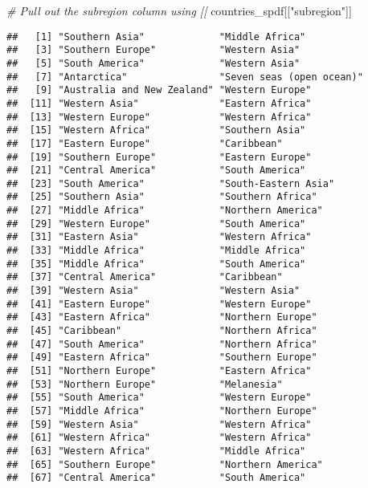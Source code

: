 \documentclass[]{article}
\newenvironment{Shaded}{\begin{snugshade}}{\end{snugshade}}
\newcommand{\CommentTok}[1]{\textcolor[rgb]{0.56,0.35,0.01}{\textit{#1}}}
\newcommand{\NormalTok}[1]{#1}
\newcommand{\StringTok}[1]{\textcolor[rgb]{0.31,0.60,0.02}{#1}}
\begin{document}
\begin{Shaded}
\begin{Highlighting}[]
\CommentTok{# Pull out the subregion column using [[}
\NormalTok{countries_spdf[[}\StringTok{"subregion"}\NormalTok{]]}
\end{Highlighting}
\end{Shaded}

\begin{verbatim}
##   [1] "Southern Asia"             "Middle Africa"            
##   [3] "Southern Europe"           "Western Asia"             
##   [5] "South America"             "Western Asia"             
##   [7] "Antarctica"                "Seven seas (open ocean)"  
##   [9] "Australia and New Zealand" "Western Europe"           
##  [11] "Western Asia"              "Eastern Africa"           
##  [13] "Western Europe"            "Western Africa"           
##  [15] "Western Africa"            "Southern Asia"            
##  [17] "Eastern Europe"            "Caribbean"                
##  [19] "Southern Europe"           "Eastern Europe"           
##  [21] "Central America"           "South America"            
##  [23] "South America"             "South-Eastern Asia"       
##  [25] "Southern Asia"             "Southern Africa"          
##  [27] "Middle Africa"             "Northern America"         
##  [29] "Western Europe"            "South America"            
##  [31] "Eastern Asia"              "Western Africa"           
##  [33] "Middle Africa"             "Middle Africa"            
##  [35] "Middle Africa"             "South America"            
##  [37] "Central America"           "Caribbean"                
##  [39] "Western Asia"              "Western Asia"             
##  [41] "Eastern Europe"            "Western Europe"           
##  [43] "Eastern Africa"            "Northern Europe"          
##  [45] "Caribbean"                 "Northern Africa"          
##  [47] "South America"             "Northern Africa"          
##  [49] "Eastern Africa"            "Southern Europe"          
##  [51] "Northern Europe"           "Eastern Africa"           
##  [53] "Northern Europe"           "Melanesia"                
##  [55] "South America"             "Western Europe"           
##  [57] "Middle Africa"             "Northern Europe"          
##  [59] "Western Asia"              "Western Africa"           
##  [61] "Western Africa"            "Western Africa"           
##  [63] "Western Africa"            "Middle Africa"            
##  [65] "Southern Europe"           "Northern America"         
##  [67] "Central America"           "South America"            

\end{verbatim}
\end{document}
